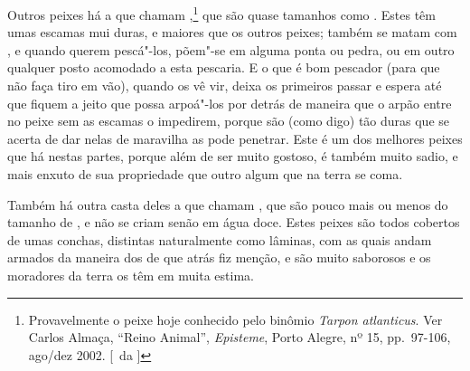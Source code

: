 Outros peixes há a que chamam ,\footnote{ Provavelmente o 
peixe hoje conhecido pelo binômio \textit{Tarpon atlanticus}. Ver Carlos Almaça, ``Reino Animal'', 
\textit{Episteme}, Porto Alegre, nº 15, pp.~97-106, ago/dez 2002. [~da ]} que são quase tamanhos como
. Estes têm umas escamas
mui duras, e maiores que os outros peixes;
também se matam com , e quando querem pescá"-los, põem"-se em alguma
ponta ou pedra, ou em outro qualquer posto acomodado a esta pescaria. E			%
o que é bom pescador (para que não faça tiro em vão), quando os vê vir, 
deixa os primeiros passar e espera até que fiquem a jeito que possa
arpoá"-los por detrás de maneira que o arpão entre no peixe sem as escamas
o impedirem, porque são (como digo) tão duras que se acerta de dar
nelas de maravilha as pode penetrar. Este é um dos melhores peixes que
há nestas partes, porque além de ser muito gostoso, é também muito
sadio, e mais enxuto de sua propriedade que outro algum que na terra se coma.

Também há outra casta deles a que chamam , que são pouco mais ou
menos do tamanho de , e não se criam senão em água doce. Estes
peixes são todos cobertos de umas conchas, distintas naturalmente como
lâminas, com as quais andam armados da maneira dos  de que atrás
fiz menção, e são muito saborosos e os moradores da terra os têm em muita estima. 

